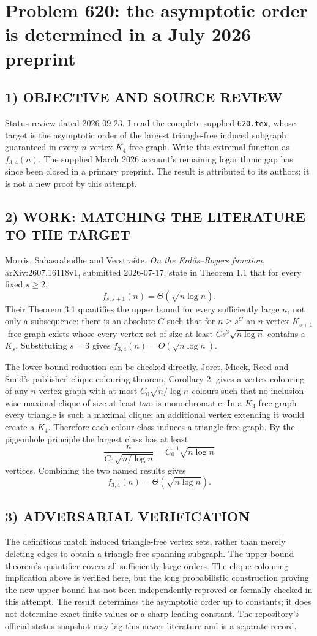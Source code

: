 \section{Problem 620: the asymptotic order is determined in a July 2026 preprint}
\subsection*{1) OBJECTIVE AND SOURCE REVIEW}
Status review dated 2026-09-23. I read the complete supplied \texttt{620.tex}, whose target is the asymptotic order of the largest triangle-free induced subgraph guaranteed in every $n$-vertex $K_4$-free graph. Write this extremal function as $f_{3,4}(n)$. The supplied March 2026 account's remaining logarithmic gap has since been closed in a primary preprint. The result is attributed to its authors; it is not a new proof by this attempt.
\subsection*{2) WORK: MATCHING THE LITERATURE TO THE TARGET}
Morris, Sahasrabudhe and Verstra\"ete, \emph{On the Erd\H{o}s--Rogers function}, arXiv:2607.16118v1, submitted 2026-07-17, state in Theorem 1.1 that for every fixed $s\ge2$,
\[
f_{s,s+1}(n)=\Theta(\sqrt{n\log n}).
\]
Their Theorem 3.1 quantifies the upper bound for every sufficiently large $n$, not only a subsequence: there is an absolute $C$ such that for $n\ge s^C$ an $n$-vertex $K_{s+1}$-free graph exists whose every vertex set of size at least $Cs^3\sqrt{n\log n}$ contains a $K_s$. Substituting $s=3$ gives $f_{3,4}(n)=O(\sqrt{n\log n})$.

The lower-bound reduction can be checked directly. Joret, Micek, Reed and Smid's published clique-colouring theorem, Corollary 2, gives a vertex colouring of any $n$-vertex graph with at most $C_0\sqrt{n/\log n}$ colours such that no inclusion-wise maximal clique of size at least two is monochromatic. In a $K_4$-free graph every triangle is such a maximal clique: an additional vertex extending it would create a $K_4$. Therefore each colour class induces a triangle-free graph. By the pigeonhole principle the largest class has at least
\[
\frac{n}{C_0\sqrt{n/\log n}}=C_0^{-1}\sqrt{n\log n}
\]
vertices. Combining the two named results gives
\[
\boxed{f_{3,4}(n)=\Theta(\sqrt{n\log n})}.
\]
\subsection*{3) ADVERSARIAL VERIFICATION}
The definitions match induced triangle-free vertex sets, rather than merely deleting edges to obtain a triangle-free spanning subgraph. The upper-bound theorem's quantifier covers all sufficiently large orders. The clique-colouring implication above is verified here, but the long probabilistic construction proving the new upper bound has not been independently reproved or formally checked in this attempt. The result determines the asymptotic order up to constants; it does not determine exact finite values or a sharp leading constant. The repository's official status snapshot may lag this newer literature and is a separate record.
